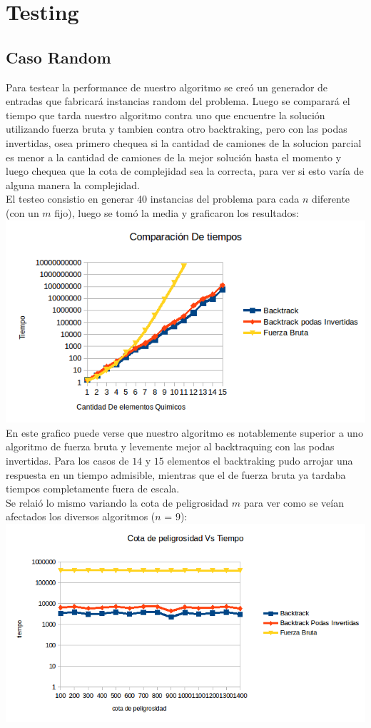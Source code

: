 \section{Testing}
\subsection{Caso Random}
Para testear la performance de nuestro algoritmo se cre\'o un generador de entradas que fabricar\'a instancias random del problema. Luego se comparar\'a el tiempo que tarda nuestro algoritmo contra uno que encuentre la soluci\'on utilizando fuerza bruta y tambien contra otro backtraking, pero con las podas invertidas, osea primero chequea si la cantidad de camiones de la solucion parcial es menor a la cantidad de camiones de la mejor soluci\'on hasta el momento y luego chequea que la cota de complejidad sea la correcta, para ver si esto var\'ia de alguna manera la complejidad.
\\
El testeo consistio en generar 40 instancias del problema para cada $n$ diferente (con un $m$ fijo), luego se tom\'o la media y graficaron los resultados:
\\
\includegraphics[width=18cm]{./Ej3/graph1.png}
\\
En este grafico puede verse que nuestro algoritmo es notablemente superior a uno algoritmo de fuerza bruta y levemente mejor al backtraquing con las podas invertidas. Para los casos de $14$ y $15$ elementos el backtraking pudo arrojar una respuesta en un tiempo admisible, mientras que el de fuerza bruta ya tardaba tiempos completamente fuera de escala.
\\
Se relai\'o lo mismo variando la cota de peligrosidad $m$ para ver como se ve\'ian afectados los diversos algoritmos ($n$ = $9$):
\\
\includegraphics[width=18cm]{./Ej3/graph2.png}
